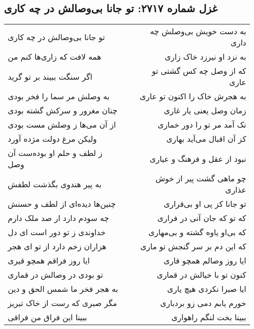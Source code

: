 \begin{center}
\section*{غزل شماره ۲۷۱۷: تو جانا بی‌وصالش در چه کاری}
\label{sec:2717}
\begin{longtable}{l p{0.5cm} r}
تو جانا بی‌وصالش در چه کاری
&&
به دست خویش بی‌وصلش چه داری
\\
همه لافت که زاری‌ها کنم من
&&
به نزد او نیرزد خاک زاری
\\
اگر سنگت ببیند بر تو گرید
&&
که از وصل چه کس گشتی تو عاری
\\
به وصلش مر سما را فخر بودی
&&
به هجرش خاک را اکنون تو عاری
\\
چنان مغرور و سرکش گشته بودی
&&
زمان وصل یعنی یار غاری
\\
از آن می‌ها ز وصلش مست بودی
&&
نک آمد مر تو را دور خماری
\\
ولیکن مرغ دولت مژده آورد
&&
کز آن اقبال می‌آید بهاری
\\
ز لطف و حلم او بوده‌ست آن وصل
&&
نبود از عقل و فرهنگ و عیاری
\\
به پیر هندوی بگذشت لطفش
&&
چو ماهی گشت پیر از خوش عذاری
\\
چنین‌ها دیده‌ای از لطف و حسنش
&&
تو جانا کز پی او بی‌قراری
\\
چه سودم دارد ار صد ملک دارم
&&
که تو که جان آنی در فراری
\\
خداوندی ز تو دور است ای دل
&&
که بی‌او یاوه گشته و بی‌مهاری
\\
هزاران زخم دارد از تو ای هجر
&&
که این دم بر سر گنجش تو ماری
\\
ایا روز فراقم همچو قیری
&&
ایا روز وصالم همچو قاری
\\
تو بودی در وصالش در قماری
&&
کنون تو با خیالش در قماری
\\
به هجر فخر ما شمس الحق و دین
&&
ایا صبرا نکردی هیچ یاری
\\
مگر صبری که رست از خاک تبریز
&&
خورم یابم دمی زو بردباری
\\
ببینا این فراق من فراقی
&&
ببینا بخت لنگم راهواری
\\
\end{longtable}
\end{center}
